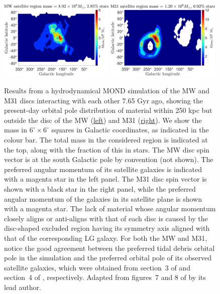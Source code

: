 \documentclass[fleqn,usenatbib,useAMS,onecolumn]{mnras} %
\begin{document}
\begin{figure}
	\centering
	\includegraphics[width=0.49\textwidth]{MW_SP_50}
	\hfill
	\includegraphics[width=0.49\textwidth]{M31_SP_50}
	\caption{Results from a hydrodynamical MOND simulation of the MW and M31 discs interacting with each other 7.65 Gyr ago, showing the present-day orbital pole distribution of material within 250 kpc but outside the disc of the MW (\underline{left}) and M31 (\underline{right}). We show the mass in $6^\circ \times 6^\circ$ squares in Galactic coordinates, as indicated in the colour bar. The total mass in the considered region is indicated at the top, along with the fraction of this in stars. The MW disc spin vector is at the south Galactic pole by convention (not shown). The preferred angular momentum of its satellite galaxies is indicated with a magenta star in the left panel. The M31 disc spin vector is shown with a black star in the right panel, while the preferred angular momentum of the galaxies in its satellite plane is shown with a magenta star. The lack of material whose angular momentum closely aligns or anti-aligns with that of each disc is caused by the disc-shaped excluded region having its symmetry axis aligned with that of the corresponding LG galaxy. For both the MW and M31, notice the good agreement between the preferred tidal debris orbital pole in the simulation and the preferred orbital pole of its observed satellite galaxies, which were obtained from section~3 of \citet{Pawlowski_2013_VPOS} and section~4 of \citet{Pawlowski_2013_LG}, respectively. Adapted from figures~7 and 8 of \citet{Banik_2022_satellite_plane} by its lead author.}
	\label{PoR_SP_50}
\end{figure}
\end{document}
